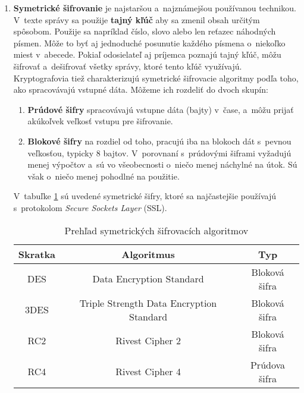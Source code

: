 \begin{enumerate}

\item \textbf{Symetrické šifrovanie} je najstaršou a~najznámejšou používanou technikou. V~texte správy sa použije \textbf{tajný kľúč} aby sa zmenil obsah určitým spôsobom. Použije sa napríklad číslo, slovo alebo len reťazec náhodných písmen. Môže to byť aj jednoduché posunutie každého písmena o~niekoľko miest v~abecede. Pokiaľ odosielateľ aj príjemca poznajú tajný kľúč, môžu šifrovať a~dešifrovať všetky správy, ktoré tento kľúč využívajú. Kryptografovia tiež charakterizujú symetrické šifrovacie algoritmy podľa toho, ako spracovávajú vstupné dáta. Môžeme ich rozdeliť do dvoch skupín:

\begin{enumerate}

\item \textbf{Prúdové šifry} spracovávajú vstupne dáta (bajty) v~čase, a~môžu prijať akú\-koľvek veľkosť vstupu pre šifrovanie.

\item \textbf{Blokové šifry} na rozdiel od toho, pracujú iba na blokoch dát s~pevnou veľkosťou, typicky 8 bajtov. V~porovnaní s~prúdovými šiframi vyžadujú menej výpočtov a~sú vo všeobecnosti o~niečo menej náchylné na útok. Sú však o~niečo menej pohodlné na použitie.

\end{enumerate}

V~tabuľke \ref{symetricke-sifry} sú uvedené symetrické šifry, ktoré sa najčastejšie používajú s~protokolom \emph{Secure Sockets Layer} (SSL).

\begin{table}[h]
  \caption{Prehľad symetrických šifrovacích algoritmov}
  \label{symetricke-sifry}
  \begin{center}
  	\small
	  \begin{tabular}{|c|c|c|}
	    \hline
	    Skratka    						& Algoritmus 					& Typ 						  \\
	    \hline\hline
	    DES	& Data Encryption Standard 	& Bloková šifra \\
	    \hline
	    3DES 		& Triple Strength Data Encryption Standard 	& Bloková šifra \\
	    \hline
	    RC2 		& Rivest Cipher 2 & Bloková šifra  \\
	    \hline
	    RC4 	& Rivest Cipher 4 & Prúdova šifra  \\
	    
	    \hline
	  \end{tabular}
  \end{center}
\end{table}


\end{enumerate}

